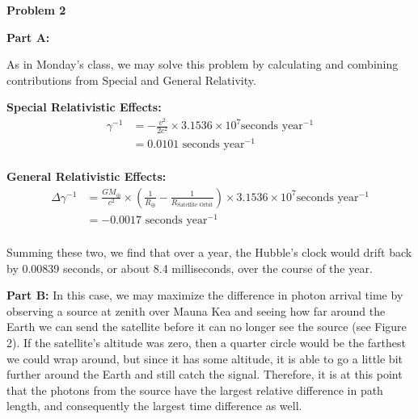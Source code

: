 \documentclass[12pt]{article}
\begin{document}
\begin{onehalfspacing}
\raggedright{\textbf{\Large Problem 2}}\\
\raggedright{\textbf{\large Part A: }}

As in Monday's class, we may solve this problem by calculating and combining contributions from Special and General Relativity.

\bigskip

\textbf{Special Relativistic Effects:}
\begin{align*}
  \gamma^{-1} &= - \frac{v^2}{2 c^2} \times 3.1536 \times 10^7 \text{seconds year$^{-1}$}\\
              &= 0.0101 \text{ seconds year$^{-1}$}\\
\end{align*}


\textbf{General Relativistic Effects:}
\begin{align*}
  \Delta \gamma^{-1} &= \frac{G M_{\oplus}}{c^2} \times \left( \frac{1}{R_{\oplus}} - \frac{1}{R_{\text{Satellite Orbit}}} \right)  \times 3.1536 \times 10^7 \text{seconds year$^{-1}$}\\
                     &= -0.0017  \text{ seconds year$^{-1}$} \\
\end{align*}


Summing these two, we find that over a year, the Hubble's clock would drift back by 0.00839 seconds, or about 8.4 milliseconds, over the course of the year.

\bigskip
\bigskip

\raggedright{\textbf{\large Part B: }}
In this case, we may maximize the difference in photon arrival time by observing a source at zenith over Mauna Kea and seeing how far around the Earth we can send the satellite before it can no longer see the source (see Figure 2). If the satellite's altitude was zero, then a quarter circle would be the farthest we could wrap around, but since it has some altitude, it is able to go a little bit further around the Earth and still catch the signal. Therefore, it is at this point that the photons from the source have the largest relative difference in path length, and consequently the largest time difference as well. \bigskip


\end{onehalfspacing}
\end{document}
